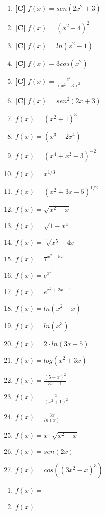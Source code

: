 \begin{enumerate}[topsep=0pt]
	\item \textbf{[C]} $ f(x) = sen(2x^2 + 3) $
	\item \textbf{[C]} $ f(x) = (x^2 - 4)^2 $
	\item \textbf{[C]} $ f(x) = ln(x^2-1) $
	\item \textbf{[C]} $ f(x) = 3 cos(x^2) $
	\item \textbf{[C]} $ f(x) = \frac{e^x}{(x^2-3)^2} $
	\item \textbf{[C]} $ f(x) = sen^2(2x+3) $
	\item $ f(x) =  (x^2+1)^3$
	\item $ f(x) =  (x^3-2x^4)$
	\item $ f(x) =  (x^4 +x^2 -3)^{-2}$
	\item $ f(x) =  x^{1/3}$
	\item $ f(x) =  (x^2+3x-5)^{1/2}$
	\item $ f(x) =  \sqrt{x^2-x}$
	\item $ f(x) =  \sqrt{1-x^4}$
	\item $ f(x) =  \sqrt[3]{x^5-4x}$
	\item $ f(x) =  7^{x^2+5x}$
	\item $ f(x) =  e^{x^2}$
	\item $ f(x) =  e^{x^2+2x-1}$
	\item $ f(x) =  ln(x^2-x)$
	\item $ f(x) =  ln(x^3)$
	\item $ f(x) =  2 \cdot ln(3x+5)$
	\item $ f(x) =  log(x^2+3x)$
	\item $ f(x) =  \frac{(5-x)^2}{3x-1}$
	\item $ f(x) =  \frac{x}{(x^2+1)^2}$
	\item $ f(x) =  \frac{3x}{ln(x)}$
	\item $ f(x) =  x \cdot \sqrt{x^2-x}$
	\item $ f(x) =  sen(2x)$
	\item $ f(x) =  cos((3x^2 -x)^3)$
\end{enumerate}
\begin{enumerate}[label=b\alph*.,topsep=0pt]
	\item $ f(x) =  $
	\item $ f(x) =  $
\end{enumerate}


